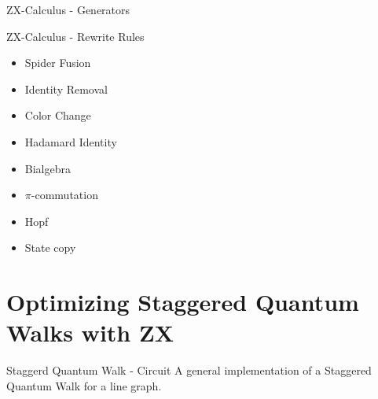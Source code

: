 \documentclass{beamer}
\begin{document}
\begin{frame}{ZX-Calculus - Generators}
\end{frame}
\begin{frame}{ZX-Calculus - Rewrite Rules}



	\begin{multicols}{2}
		\begin{itemize}
			\item Spider Fusion
			\item Identity Removal
			\item Color Change
			\item Hadamard Identity
			\item Bialgebra
			\item $\pi$-commutation
			\item Hopf
			\item State copy


		\end{itemize}
	\end{multicols}



\end{frame}
\section{Optimizing Staggered Quantum Walks with ZX}

\begin{frame}{Staggerd Quantum Walk - Circuit}
	A general implementation of a Staggered Quantum Walk for a line graph.


\end{frame}
\end{document}
